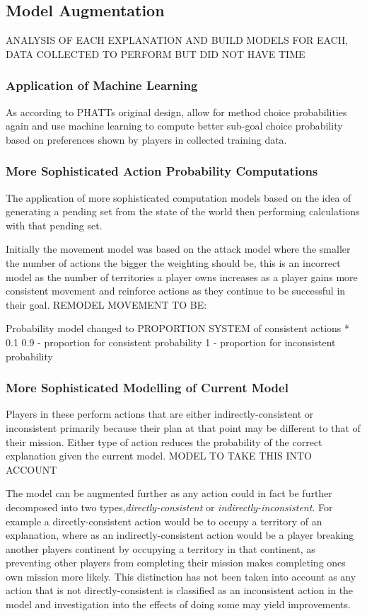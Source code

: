 \documentclass[parskip]{cs4rep}
\begin{document}
\subsection{Model Augmentation}

ANALYSIS OF EACH EXPLANATION AND BUILD MODELS FOR EACH, DATA COLLECTED TO PERFORM BUT DID NOT HAVE TIME

\subsubsection{Application of Machine Learning}

As according to PHATTs original design, allow for method choice probabilities again and use machine learning to compute better sub-goal choice probability based on preferences shown by players in collected training data.

\subsubsection{More Sophisticated Action Probability Computations}

The application of more sophisticated computation models based on the idea of generating a pending set from the state of the world then performing calculations with that pending set.

Initially the movement model was based on the attack model where the smaller the number of actions the bigger the weighting should be, this is an incorrect model as the number of territories a player owns increases as a player gains more consistent movement and reinforce actions as they continue to be successful in their goal. REMODEL MOVEMENT TO BE:

Probability model changed to PROPORTION SYSTEM of consistent actions * 0.1 
0.9 - proportion for consistent probability
1 - proportion for inconsistent probability

\subsubsection{More Sophisticated Modelling of Current Model}

Players in these perform actions that are either indirectly-consistent or inconsistent  primarily because their plan at that point may be different to that of their mission. Either type of action reduces the probability of the correct explanation given the current model. MODEL TO TAKE THIS INTO ACCOUNT

The model can be augmented further as any action could in fact be further decomposed into two types,\textit{directly-consistent} or \textit{indirectly-inconsistent}. For example a directly-consistent action would be to occupy a territory of an explanation, where as an indirectly-consistent action would be a player breaking another players continent by occupying a territory in that continent, as preventing other players from completing their mission makes completing ones own mission more likely. This distinction has not been taken into account as any action that is not directly-consistent is classified as an inconsistent action in the model and investigation into the effects of doing some may yield improvements.
\end{document}
